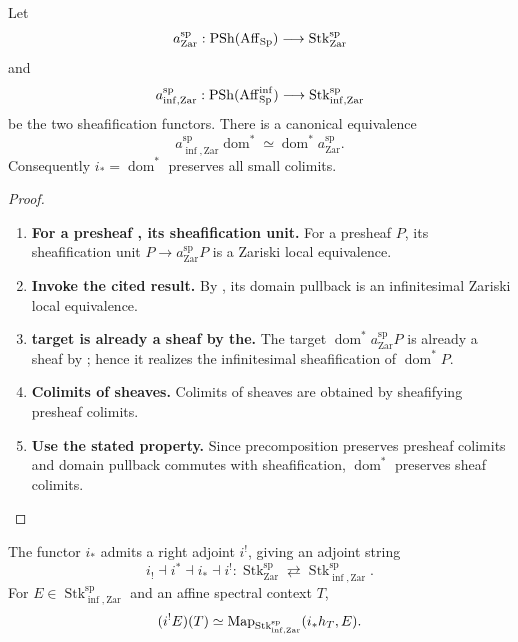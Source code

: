 \begin{theorem}
\label{thm:source-pullback-sheafification}
Let
\[
    a_{\mathrm{Zar}}^{\mathrm{sp}}
    :
    \operatorname{PSh}(\operatorname{Aff}_{\operatorname{Sp}})
    \longrightarrow
    \operatorname{Stk}^{\mathrm{sp}}_{\mathrm{Zar}}
\]
and
\[
    a_{\inf,\mathrm{Zar}}^{\mathrm{sp}}
    :
    \operatorname{PSh}(\operatorname{Aff}_{\operatorname{Sp}}^{\inf})
    \longrightarrow
    \operatorname{Stk}^{\mathrm{sp}}_{\inf,\mathrm{Zar}}
\]
be the two sheafification functors. There is a canonical equivalence
\[
    a_{\inf,\mathrm{Zar}}^{\mathrm{sp}}\operatorname{dom}^*
    \simeq
    \operatorname{dom}^*a_{\mathrm{Zar}}^{\mathrm{sp}}.
\]
Consequently \(i_*=\operatorname{dom}^*\) preserves all small colimits.
\end{theorem}

\begin{proof}
\leavevmode
\begin{enumerate}[label=\textup{(\arabic*)}]
    \item \textbf{For a presheaf , its sheafification unit.}
    For a presheaf \(P\), its sheafification unit \(P\to a_{\mathrm{Zar}}^{\mathrm{sp}}P\) is a Zariski local
    equivalence.

    \item \textbf{Invoke the cited result.}
    By , its domain pullback is an infinitesimal
    Zariski local equivalence.

    \item \textbf{target is already a sheaf by the.}
    The target \(\operatorname{dom}^*a_{\mathrm{Zar}}^{\mathrm{sp}}P\) is already a sheaf by
    ; hence it realizes the infinitesimal
    sheafification of \(\operatorname{dom}^*P\).

    \item \textbf{Colimits of sheaves.}
    Colimits of sheaves are obtained by sheafifying presheaf colimits.

    \item \textbf{Use the stated property.}
    Since precomposition preserves presheaf colimits and domain pullback commutes with
    sheafification, \(\operatorname{dom}^*\) preserves sheaf colimits.
\end{enumerate}
\end{proof}

\begin{theorem}
\label{thm:infinitesimal-adjoint-string}
The functor \(i_*\) admits a right adjoint \(i^!\), giving an adjoint string
\[
    i_!
    \dashv
    i^*
    \dashv
    i_*
    \dashv
    i^!
    :
    \operatorname{Stk}^{\mathrm{sp}}_{\mathrm{Zar}}
    \rightleftarrows
    \operatorname{Stk}^{\mathrm{sp}}_{\inf,\mathrm{Zar}}.
\]
For \(E\in\operatorname{Stk}^{\mathrm{sp}}_{\inf,\mathrm{Zar}}\) and an
affine spectral context \(T\),
\[
    (i^!E)(T)
    \simeq
    \operatorname{Map}_{\operatorname{Stk}^{\mathrm{sp}}_{\inf,\mathrm{Zar}}}
    (i_*h_T,E).
\]
\end{theorem}

